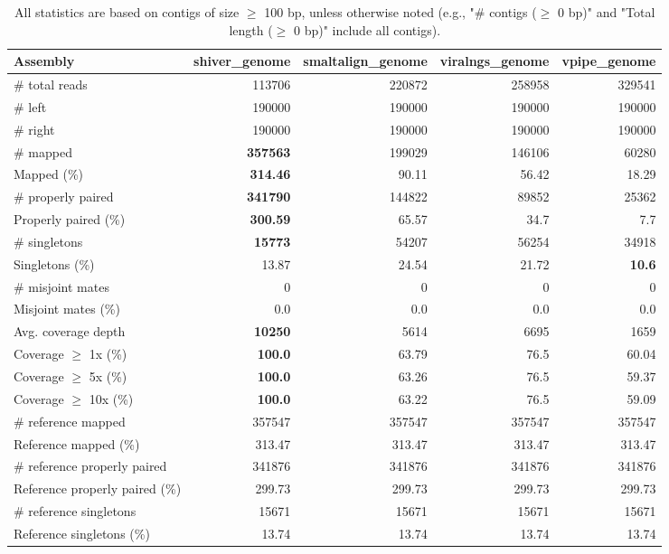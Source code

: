 \documentclass[12pt,a4paper]{article}
\begin{document}
\begin{table}[ht]
\begin{center}
\caption{All statistics are based on contigs of size $\geq$ 100 bp, unless otherwise noted (e.g., "\# contigs ($\geq$ 0 bp)" and "Total length ($\geq$ 0 bp)" include all contigs).}
\begin{tabular}{|l*{4}{|r}|}
\hline
Assembly & shiver\_genome & smaltalign\_genome & viralngs\_genome & vpipe\_genome \\ \hline
\# total reads & 113706 & 220872 & 258958 & 329541 \\ \hline
\# left & 190000 & 190000 & 190000 & 190000 \\ \hline
\# right & 190000 & 190000 & 190000 & 190000 \\ \hline
\# mapped & {\bf 357563} & 199029 & 146106 & 60280 \\ \hline
Mapped (\%) & {\bf 314.46} & 90.11 & 56.42 & 18.29 \\ \hline
\# properly paired & {\bf 341790} & 144822 & 89852 & 25362 \\ \hline
Properly paired (\%) & {\bf 300.59} & 65.57 & 34.7 & 7.7 \\ \hline
\# singletons & {\bf 15773} & 54207 & 56254 & 34918 \\ \hline
Singletons (\%) & 13.87 & 24.54 & 21.72 & {\bf 10.6} \\ \hline
\# misjoint mates & 0 & 0 & 0 & 0 \\ \hline
Misjoint mates (\%) & 0.0 & 0.0 & 0.0 & 0.0 \\ \hline
Avg. coverage depth & {\bf 10250} & 5614 & 6695 & 1659 \\ \hline
Coverage $\geq$ 1x (\%) & {\bf 100.0} & 63.79 & 76.5 & 60.04 \\ \hline
Coverage $\geq$ 5x (\%) & {\bf 100.0} & 63.26 & 76.5 & 59.37 \\ \hline
Coverage $\geq$ 10x (\%) & {\bf 100.0} & 63.22 & 76.5 & 59.09 \\ \hline
\# reference mapped & 357547 & 357547 & 357547 & 357547 \\ \hline
Reference mapped (\%) & 313.47 & 313.47 & 313.47 & 313.47 \\ \hline
\# reference properly paired & 341876 & 341876 & 341876 & 341876 \\ \hline
Reference properly paired (\%) & 299.73 & 299.73 & 299.73 & 299.73 \\ \hline
\# reference singletons & 15671 & 15671 & 15671 & 15671 \\ \hline
Reference singletons (\%) & 13.74 & 13.74 & 13.74 & 13.74 \\ \hline

\end{tabular}
\end{center}
\end{table}
\end{document}
